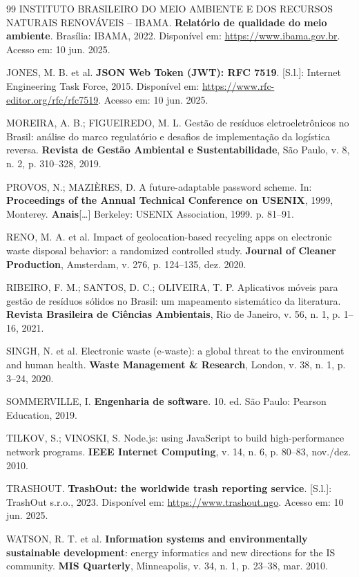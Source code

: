 \documentclass[12pt, a4paper]{article}
\numberwithin{equation}{section}
\numberwithin{figure}{section}
\numberwithin{table}{section}
\begin{document}
\begin{thebibliography}{99}
INSTITUTO BRASILEIRO DO MEIO AMBIENTE E DOS RECURSOS NATURAIS RENOVÁVEIS --
IBAMA.
\textbf{Relatório de qualidade do meio ambiente}. Brasília: IBAMA, 2022.
Disponível em: \url{https://www.ibama.gov.br}. Acesso em: 10 jun. 2025.

JONES, M. B. et al.
\textbf{JSON Web Token (JWT): RFC 7519}. [S.l.]: Internet Engineering Task
Force, 2015. Disponível em: \url{https://www.rfc-editor.org/rfc/rfc7519}.
Acesso em: 10 jun. 2025.

MOREIRA, A. B.; FIGUEIREDO, M. L.
Gestão de resíduos eletroeletrônicos no Brasil: análise do marco regulatório
e desafios de implementação da logística reversa.
\textbf{Revista de Gestão Ambiental e Sustentabilidade}, São Paulo, v. 8,
n. 2, p. 310--328, 2019.

PROVOS, N.; MAZIÈRES, D.
A future-adaptable password scheme.
In: \textbf{Proceedings of the Annual Technical Conference on USENIX}, 1999,
Monterey. \textbf{Anais}[\ldots] Berkeley: USENIX Association, 1999.
p. 81--91.

RENO, M. A. et al.
Impact of geolocation-based recycling apps on electronic waste disposal
behavior: a randomized controlled study.
\textbf{Journal of Cleaner Production}, Amsterdam, v. 276, p. 124--135,
dez. 2020.

RIBEIRO, F. M.; SANTOS, D. C.; OLIVEIRA, T. P.
Aplicativos móveis para gestão de resíduos sólidos no Brasil: um mapeamento
sistemático da literatura.
\textbf{Revista Brasileira de Ciências Ambientais}, Rio de Janeiro, v. 56,
n. 1, p. 1--16, 2021.

SINGH, N. et al.
Electronic waste (e-waste): a global threat to the environment and human health.
\textbf{Waste Management \& Research}, London, v. 38, n. 1, p. 3--24, 2020.

SOMMERVILLE, I.
\textbf{Engenharia de software}. 10. ed. São Paulo: Pearson Education, 2019.

TILKOV, S.; VINOSKI, S.
Node.js: using JavaScript to build high-performance network programs.
\textbf{IEEE Internet Computing}, v. 14, n. 6, p. 80--83, nov./dez. 2010.

TRASHOUT. \textbf{TrashOut: the worldwide trash reporting service}.
[S.l.]: TrashOut s.r.o., 2023. Disponível em: \url{https://www.trashout.ngo}.
Acesso em: 10 jun. 2025.

WATSON, R. T. et al.
\textbf{Information systems and environmentally sustainable development}:
energy informatics and new directions for the IS community.
\textbf{MIS Quarterly}, Minneapolis, v. 34, n. 1, p. 23--38, mar. 2010.

\end{thebibliography}
\end{document}
